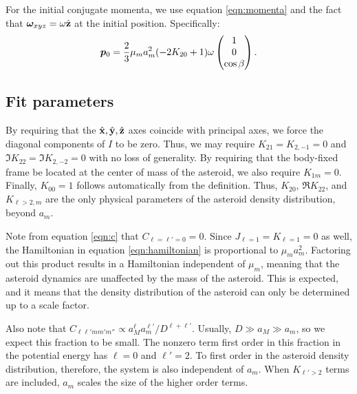 \documentclass[11pt]{article}
\begin{document}
For the initial conjugate momenta, we use equation \ref{eqn:momenta} and the fact that $\bm \omega_{xyz}=\omega \hat{\mathbf{z}}$ at the initial position. Specifically:
\begin{equation}
\bm p_0 = \frac{2}{3}\mu_m a_m^2 (-2K_{20}+1) \omega \left( \begin{matrix}1 \\0 \\ \cos \beta\end{matrix} \right).
\end{equation}

\subsection{Fit parameters}
By requiring that the $\hat{\mathbf{x}}, \hat{\mathbf{y}}, \hat{\mathbf{z}}$ axes coincide with principal axes, we force the diagonal components of $I$ to be zero. Thus, we may require $K_{21}=K_{2,-1}=0$ and $\Im K_{22}=\Im K_{2,-2}=0$ with no loss of generality. By requiring that the body-fixed frame be located at the center of mass of the asteroid, we also require $K_{1m}=0$. Finally, $K_{00}=1$ follows automatically from the definition. Thus, $K_{20}$, $\Re K_{22}$, and $K_{\ell>2, m}$ are the only physical parameters of the asteroid density distribution, beyond $a_m$.

Note from equation \ref{eqn:c} that $C_{\ell=\ell'=0}=0$. Since $J_{\ell=1}=K_{\ell=1} = 0$ as well, the Hamiltonian in equation \ref{eqn:hamiltonian} is proportional to $\mu_m a_m^2$. Factoring out this product results in a Hamiltonian independent of $\mu_m$, meaning that the asteroid dynamics are unaffected by the mass of the asteroid. This is expected, and it means that the density distribution of the asteroid can only be determined up to a scale factor.

Also note that $C_{\ell \ell' m m' m''} \propto a_M^\ell a_m^{\ell'} / D^{\ell+\ell'}$. Usually, $D \gg a_M \gg a_m$, so we expect this fraction to be small. The nonzero term first order in this fraction in the potential energy has $\ell = 0$ and $\ell'=2$. To first order in the asteroid density distribution, therefore, the system is also independent of $a_m$. When $K_{\ell' > 2}$ terms are included, $a_m$ scales the size of the higher order terms.
\end{document}
